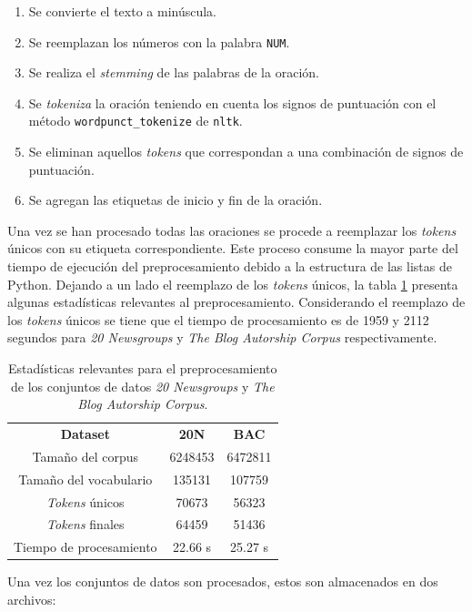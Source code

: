 \begin{enumerate}
    \item Se convierte el texto a minúscula.
    \item Se reemplazan los números con la palabra \texttt{NUM}.
    \item Se realiza el \textit{stemming} de las palabras de la oración.
    \item Se \textit{tokeniza} la oración teniendo en cuenta los signos de puntuación con el método \texttt{wordpunct\_tokenize} de \texttt{nltk}.
    \item Se eliminan aquellos \textit{tokens} que correspondan a una combinación de signos de puntuación.
    \item Se agregan las etiquetas de inicio y fin de la oración.
\end{enumerate}

Una vez se han procesado todas las oraciones se procede a reemplazar los \textit{tokens} únicos con su etiqueta correspondiente. Este proceso consume la mayor parte del tiempo de ejecución del preprocesamiento debido a la estructura de las listas de Python. Dejando a un lado el reemplazo de los \textit{tokens} únicos, la tabla \ref{tab:ngrams_preproc} presenta algunas estadísticas relevantes al preprocesamiento. Considerando el reemplazo de los \textit{tokens} únicos se tiene que el tiempo de procesamiento es de 1959 y 2112 segundos para \textit{20 Newsgroups} y \textit{The Blog Autorship Corpus} respectivamente.

\begin{table}[h]
    \centering
    \begin{tabular}{|c|c|c|}
        \textbf{Dataset}  & \textbf{20N} & \textbf{BAC} \\
        Tamaño del corpus & 6248453 & 6472811 \\
        Tamaño del vocabulario & 135131 & 107759 \\
        \textit{Tokens} únicos & 70673 & 56323 \\
        \textit{Tokens} finales & 64459 & 51436 \\
        Tiempo de procesamiento & 22.66 s & 25.27 s
    \end{tabular}
    \caption{Estadísticas relevantes para el preprocesamiento de los conjuntos de datos \textit{20 Newsgroups} y \textit{The Blog Autorship Corpus}.}
    \label{tab:ngrams_preproc}
\end{table}

Una vez los conjuntos de datos son procesados, estos son almacenados en dos archivos:


